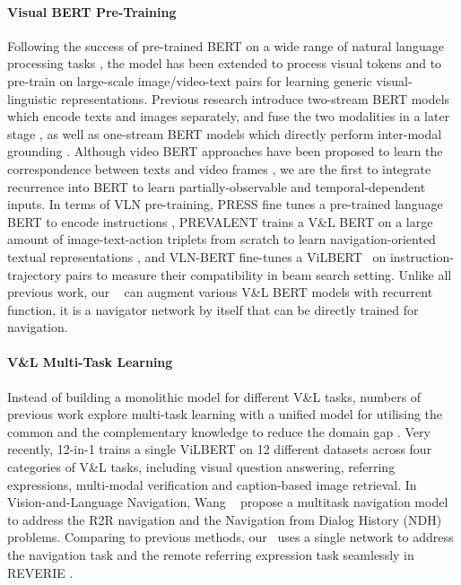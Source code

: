 \documentclass[final]{cvpr}
\begin{document}
\paragraph{Visual BERT Pre-Training} 
Following the success of pre-trained BERT on a wide range of natural language processing tasks \cite{devlin2019bert}, the model has been extended to process visual tokens and to pre-train on large-scale image/video-text pairs for learning generic visual-linguistic representations. Previous research introduce two-stream BERT models which encode texts and images separately, and fuse the two modalities in a later stage \cite{lu2019vilbert,tan2019lxmert}, as well as one-stream BERT models which directly perform inter-modal grounding \cite{chen2020uniter,li2020unicoder,li2019visualbert,li2020oscar,su2019vl}. Although video BERT approaches have been proposed to learn the correspondence between texts and video frames \cite{li2020hero,luo2020univilm,sun2019videobert,yang2020bert}, we are the first to integrate recurrence into BERT to learn partially-observable and temporal-dependent inputs.
In terms of VLN pre-training, PRESS fine tunes a pre-trained language BERT to encode instructions \cite{li2019robust}, PREVALENT trains a V\&L BERT on a large amount of image-text-action triplets from scratch to learn navigation-oriented textual representations \cite{hao2020towards}, and VLN-BERT \cite{majumdar2020improving} fine-tunes a ViLBERT~\cite{lu2019vilbert} on instruction-trajectory pairs to measure their compatibility in beam search setting. Unlike all previous work, our \vlnbert~ can augment various V\&L BERT models with recurrent function, it is a navigator network by itself that can be directly trained for navigation.

\vspace{-15pt}
\paragraph{V\&L Multi-Task Learning}
Instead of building a monolithic model for different V\&L tasks, numbers of previous work explore multi-task learning with a unified model for utilising the common and the complementary knowledge to reduce the domain gap \cite{li2018visual,nguyen2019multi,pramanik2019omninet,shuster2019dialogue,lu2019vilbert}.
Very recently, 12-in-1 \cite{lu202012} trains a single ViLBERT \cite{lu2019vilbert} on 12 different datasets across four categories of V\&L tasks, including visual question answering, referring expressions, multi-modal verification and caption-based image retrieval.
In Vision-and-Language Navigation, Wang \etal~\cite{wang2020environment} propose a multitask navigation model to address the R2R navigation \cite{anderson2018vision} and the Navigation from Dialog History (NDH) \cite{thomason2020vision} problems. Comparing to previous methods, our \vlnbert~uses a single network to address the navigation task and the remote referring expression task seamlessly in REVERIE \cite{qi2020reverie}.
\end{document}
